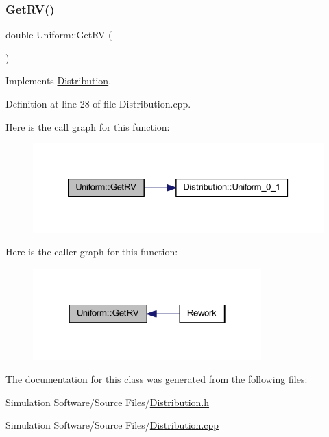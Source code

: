 \subsubsection{\texorpdfstring{Get\+R\+V()}{GetRV()}}
{\footnotesize\ttfamily double Uniform\+::\+Get\+RV (\begin{DoxyParamCaption}{ }\end{DoxyParamCaption})\hspace{0.3cm}{\ttfamily [virtual]}}



Implements \hyperlink{class_distribution_a63b433850d7b47d84eb69448f7916719}{Distribution}.



Definition at line 28 of file Distribution.\+cpp.

Here is the call graph for this function\+:
\nopagebreak
\begin{figure}[H]
\begin{center}
\leavevmode
\includegraphics[width=326pt]{class_uniform_a9350886d5ad1854294ecff338a288fc7_cgraph}
\end{center}
\end{figure}
Here is the caller graph for this function\+:
\nopagebreak
\begin{figure}[H]
\begin{center}
\leavevmode
\includegraphics[width=250pt]{class_uniform_a9350886d5ad1854294ecff338a288fc7_icgraph}
\end{center}
\end{figure}


The documentation for this class was generated from the following files\+:\begin{DoxyCompactItemize}
\item 
Simulation Software/\+Source Files/\hyperlink{_distribution_8h}{Distribution.\+h}\item 
Simulation Software/\+Source Files/\hyperlink{_distribution_8cpp}{Distribution.\+cpp}\end{DoxyCompactItemize}
